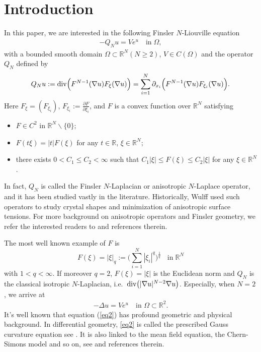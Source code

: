 \documentclass[11pt]{amsart}
\numberwithin{equation}{section}
\begin{document}
\section{Introduction}\label{sec1}
In this paper, we are interested in the following Finsler $N$-Liouville equation
\begin{align}\label{main eq1}
-Q_{N}u =V e^{u} \quad \mbox{in}\; \Omega,
\end{align}
with a bounded smooth domain $\Omega\subset\mathbb{R}^{N} (N\geq2)$, $V \in C(\Omega)$ and the operator $Q_{N}$ defined by
$$Q_{N}u:= {\rm div}\Big(F^{N-1}(\nabla u)F_{\xi}(\nabla u)\Big) = \sum_{i=1}^{N}\partial_{x_i}\Big(F^{N-1}(\nabla u)F_{\xi_{i}}(\nabla u)\Big).$$
Here $F_\xi = (F_{\xi_i})$, $F_{\xi_i} := \frac{\partial F}{\partial \xi_i}$, and $F$ is a convex function over $\mathbb{R}^N$ satisfying
\begin{itemize}
\item[--] $F \in C^{2}$ in $\mathbb{R}^{N}\backslash\{0\};$
\item[--] $F(t\xi)=|t|F(\xi)$ for any $t\in\mathbb{R}$, $\xi \in\mathbb{R}^{N};$
\item[--] there exists $0< C_1 \leq C_{2}<\infty$ such that $C_{1}|\xi|\leq F(\xi)\leq C_{2}|\xi|$ for any $\xi \in \mathbb{R}^{N}$.
\end{itemize}
In fact, $Q_{N}$ is called the Finsler $N$-Laplacian or anisotropic $N$-Laplace operator, and it has been studied vastly in the literature. Historically, Wulff \cite{W1901} used such operators to study crystal shapes and minimization of anisotropic surface tensions. For more background on anisotropic operators and Finsler geometry,
we refer the interested readers to \cite{AT1995, ATW1993, AFTL1997, CS2009, CFV2014, FM1991, SS2016} and references therein.

The most well known example of $F$ is
$$F(\xi)= |\xi|_q := \Big(\sum\limits_{i=1}^{N}|\xi_{i}|^q\Big)^{\frac{1}{q}} \;\; \mbox{ in}\; \mathbb{R}^N$$
with $1<q<\infty$. If moreover $q=2$, $F(\xi)= |\xi|$ is the Euclidean norm and $Q_{N}$ is the classical isotropic $N$-Laplacian, i.e.~${\rm div}\big(|\nabla u|^{N-2}\nabla u\big)$.  Especially, when $N=2$,  we arrive at
\begin{align}\label{eq2}
-\Delta u=V e^{u} \quad\mbox{in } \Omega \subset \mathbb{R}^{2}.
\end{align}
It's well known that equation (\ref{eq2}) has profound geometric and physical background. In differential geometry, \eqref{eq2} is called the prescribed Gauss curvature equation see \cite{KW1974,N1982,CN1991}. It is also linked to the mean field equation, the Chern-Simons model and so on, see \cite{BDM2015, BLT2011, FT2014} and references therein.
\end{document}
